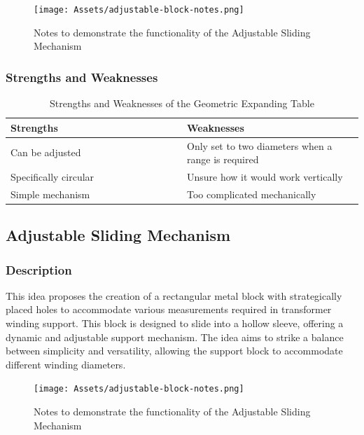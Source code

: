 \documentclass[a4paper,10pt]{article}
\begin{document}
\begin{figure}[H]
  \centering
  \texttt{[image: Assets/adjustable-block-notes.png]}
  \caption{Notes to demonstrate the functionality of the Adjustable Sliding Mechanism}
  \label{fig:adjustable-block-notes}
\end{figure}

\subsubsection{Strengths and Weaknesses}

\begin{table}[h]
  \centering
  \begin{tabular}{p{0.5\linewidth} | p{0.5\linewidth}}
    Strengths                                              & Weaknesses \\ \hline
    \textbullet{} Can be adjusted                          & \textbullet{} Only set to two diameters when a range is required \\
    \textbullet{} Specifically circular                    & \textbullet{} Unsure how it would work vertically \\
    \textbullet{} Simple mechanism                         & \textbullet{} Too complicated mechanically \\
  \end{tabular}
  \caption{Strengths and Weaknesses of the Geometric Expanding Table}
  \label{table:geometric-expanding-table-pros-cons}
\end{table}

\subsection{Adjustable Sliding Mechanism}

\subsubsection{Description}

This idea proposes the creation of a rectangular metal block with strategically placed holes to accommodate various measurements required in transformer winding support. This block is designed to slide into a hollow sleeve, offering a dynamic and adjustable support mechanism. The idea aims to strike a balance between simplicity and versatility, allowing the support block to accommodate different winding diameters.

\begin{figure}[H]
  \centering
  \texttt{[image: Assets/adjustable-block-notes.png]}
  \caption{Notes to demonstrate the functionality of the Adjustable Sliding Mechanism}
  \label{fig:adjustable-block-notes}
\end{figure}
\end{document}
